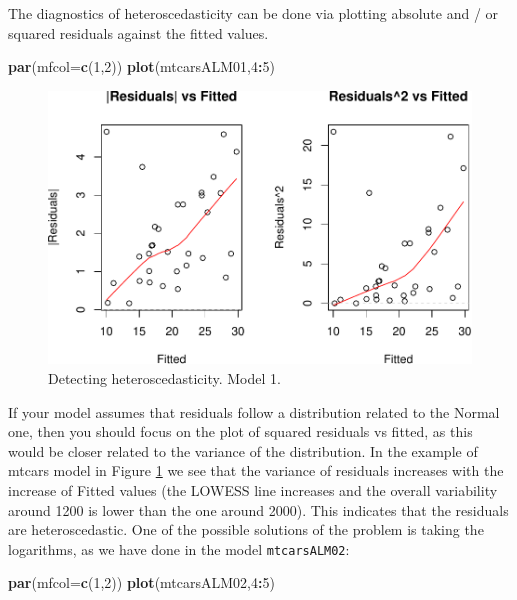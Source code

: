 \documentclass[
]{book}
\newenvironment{Shaded}{\begin{snugshade}}{\end{snugshade}}
\newcommand{\AttributeTok}[1]{\textcolor[rgb]{0.13,0.29,0.53}{#1}}
\newcommand{\DecValTok}[1]{\textcolor[rgb]{0.00,0.00,0.81}{#1}}
\newcommand{\FunctionTok}[1]{\textcolor[rgb]{0.13,0.29,0.53}{\textbf{#1}}}
\newcommand{\NormalTok}[1]{#1}
\newcommand{\SpecialCharTok}[1]{\textcolor[rgb]{0.81,0.36,0.00}{\textbf{#1}}}
\theoremstyle{definition}
\theoremstyle{definition}
\theoremstyle{definition}
\theoremstyle{definition}
\theoremstyle{remark}
\begin{document}
The diagnostics of heteroscedasticity can be done via plotting absolute and / or squared residuals against the fitted values.

\begin{Shaded}
\begin{Highlighting}[]
\FunctionTok{par}\NormalTok{(}\AttributeTok{mfcol=}\FunctionTok{c}\NormalTok{(}\DecValTok{1}\NormalTok{,}\DecValTok{2}\NormalTok{))}
\FunctionTok{plot}\NormalTok{(mtcarsALM01,}\DecValTok{4}\SpecialCharTok{:}\DecValTok{5}\NormalTok{)}
\end{Highlighting}
\end{Shaded}

\begin{figure}
\centering
\includegraphics{Svetunkov---Statistics-for-Business-Analytics_files/figure-latex/diagnostics10-1.pdf}
\caption{\label{fig:diagnostics10}Detecting heteroscedasticity. Model 1.}
\end{figure}

If your model assumes that residuals follow a distribution related to the Normal one, then you should focus on the plot of squared residuals vs fitted, as this would be closer related to the variance of the distribution. In the example of mtcars model in Figure \ref{fig:diagnostics10} we see that the variance of residuals increases with the increase of Fitted values (the LOWESS line increases and the overall variability around 1200 is lower than the one around 2000). This indicates that the residuals are heteroscedastic. One of the possible solutions of the problem is taking the logarithms, as we have done in the model \texttt{mtcarsALM02}:

\begin{Shaded}
\begin{Highlighting}[]
\FunctionTok{par}\NormalTok{(}\AttributeTok{mfcol=}\FunctionTok{c}\NormalTok{(}\DecValTok{1}\NormalTok{,}\DecValTok{2}\NormalTok{))}
\FunctionTok{plot}\NormalTok{(mtcarsALM02,}\DecValTok{4}\SpecialCharTok{:}\DecValTok{5}\NormalTok{)}
\end{Highlighting}
\end{Shaded}
\end{document}
